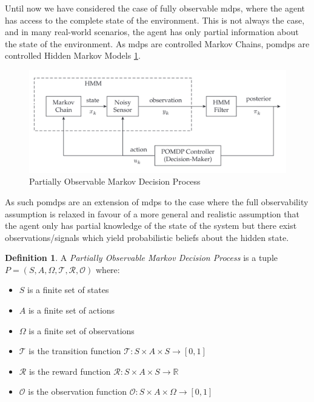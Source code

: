 \documentclass[a4paper,11pt]{report}
\theoremstyle{definition}
\newtheorem{definition}{Definition}[section]
\theoremstyle{plain}
\theoremstyle{remark}  %
\begin{document}
\cite{Spaan12pomdp}

Until now we have considered the case of fully observable \gls{mdp}s, 
where the agent has access to the complete state of the environment. This is not always the case, 
and in many real-world scenarios, the agent has only partial information about the state of the environment. 
As \gls{mdp}s are controlled Markov Chains, \gls{pomdp}s are controlled Hidden Markov Models \ref{fig:pomdp}.
\begin{figure}[H]
    \centering
    \includegraphics[scale=.15]{images/pomdp.png}
    \caption{Partially Observable Markov Decision Process \cite{Krishnamurthy_2016}}
    \label{fig:pomdp}
\end{figure}
As such \gls{pomdp}s are an extension of \gls{mdp}s to the case where the full observability assumption is 
relaxed in favour of a more general and realistic assumption that the agent only has partial knowledge 
of the state of the system but there exist observations/signals which yield probabilistic beliefs about 
the hidden state.

\begin{definition}
A \textit{Partially Observable Markov Decision Process} is a tuple $P = (S, A,\Omega, \mathcal{T}, \mathcal{R}, \mathcal{O})$ where:
\begin{itemize}
    \setlength\itemsep{0.01em}
    \item $S$ is a finite set of states
    \item $A$ is a finite set of actions
    \item $\Omega$ is a finite set of observations
    \item $\mathcal{T}$ is the transition function $\mathcal{T} : S \times A \times S \rightarrow [0,1]$
    \item $\mathcal{R}$ is the reward function $\mathcal{R} : S \times A \times S \rightarrow \mathbb{R}$
    \item $\mathcal{O}$ is the observation function $\mathcal{O} : S \times A \times \Omega \rightarrow [0,1]$
\end{itemize}
\end{definition}
\end{document}
